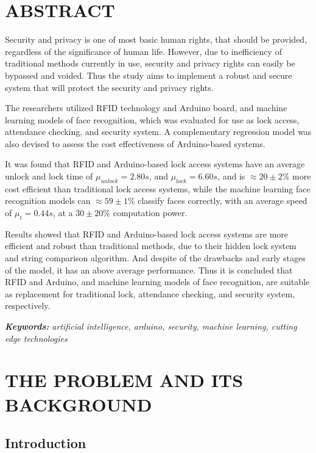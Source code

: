 \documentclass[12pt]{article}
\begin{document}
\section*{ABSTRACT\centering}

Security and privacy is one of most basic human rights, that should be provided, regardless of the significance of human life. However, due to inefficiency of traditional methods currently in use, security and privacy rights can easily be bypassed and voided. Thus the study aims to implement a robust and secure system that will protect the security and privacy rights. 

The researchers utilized RFID technology and Arduino board, and machine learning models of face recognition, which was evaluated for use as lock access, attendance checking, and security system. A complementary regression model was also devised to assess the cost effectiveness of Arduino-based systems.

It was found that RFID and Arduino-based lock access systems have an average unlock and lock time of $\mu_{unlock} = 2.80s$, and $\mu_{lock} = 6.60s$, and is $\approx 20 \pm 2\%$ more cost efficient than traditional lock access systems, while the machine learning face recognition models can $\approx 59 \pm 1\%$ classify faces correctly, with an average speed of $\mu_{t} = 0.44s$, at a $30 \pm 20\%$ computation power.

Results showed that RFID and Arduino-based lock access systems are more efficient and robust than traditional methods, due to their hidden lock system and string comparison algorithm. And despite of the drawbacks and early stages of the model, it has an above average performance. Thus it is concluded that RFID and Arduino, and machine learning models of face recognition, are suitable as replacement for traditional lock, attendance checking, and security system, respectively.

\emph{\textbf{Keywords:} artificial intelligence, arduino, security, machine learning, cutting edge technologies}

\newpage
\doublespacing
\section*{THE PROBLEM AND ITS BACKGROUND\centering}
\subsection*{Introduction\centering}
\end{document}
